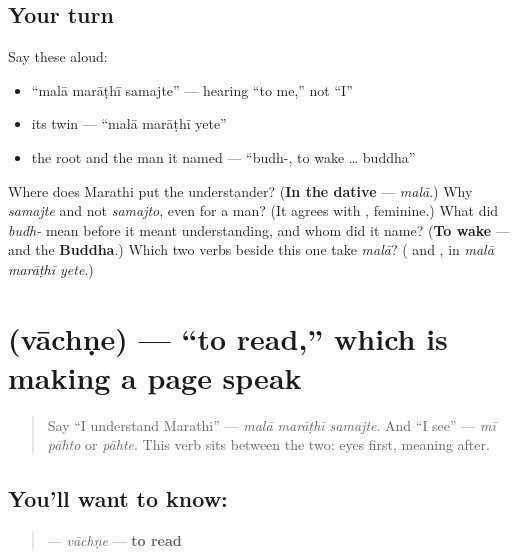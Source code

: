 \subsection*{Your turn}
Say these aloud:

\begin{itemize}
\raggedright
  \item \textquotedblleft{}malā marāṭhī samajte\textquotedblright{} — hearing \textquotedblleft{}to me,\textquotedblright{} not \textquotedblleft{}I\textquotedblright{}
  \item its twin — \textquotedblleft{}malā marāṭhī yete\textquotedblright{}
  \item the root and the man it named — \textquotedblleft{}budh-, to wake … buddha\textquotedblright{}
\end{itemize}

\begin{tcolorbox}[breakable,colback=teal!4,colframe=teal!35!black,title={Before you move on}]
Where does Marathi put the understander? (\textbf{In the dative} — \emph{malā}.) Why \emph{samajte} and not \emph{samajto}, even for a man? (It agrees with \textbf{}, feminine.) What did \emph{budh-} mean before it meant understanding, and whom did it name? (\textbf{To wake} — and the \textbf{Buddha}.) Which two verbs beside this one take \emph{malā}? (\textbf{ } and \textbf{}, in \emph{malā marāṭhī yete}.)
\end{tcolorbox}
\section[\texorpdfstring{\mr{वाचणे} (vāchṇe)}{वाचणे (vāchṇe)}]{ (vāchṇe) — \textquotedblleft{}to read,\textquotedblright{} which is making a page speak}

\label{lesson:MR-C08-vachne}



\begin{quote}
Say \textquotedblleft{}I understand Marathi\textquotedblright{} — \emph{malā marāṭhī samajte}. And \textquotedblleft{}I see\textquotedblright{} — \emph{mī pāhto} or \emph{pāhte}. This verb sits between the two: eyes first, meaning after.
\end{quote}

\subsection*{You'll want to know: }
\begin{quote}
\textbf{} — \emph{vāchṇe} — \textbf{to read}
\end{quote}


